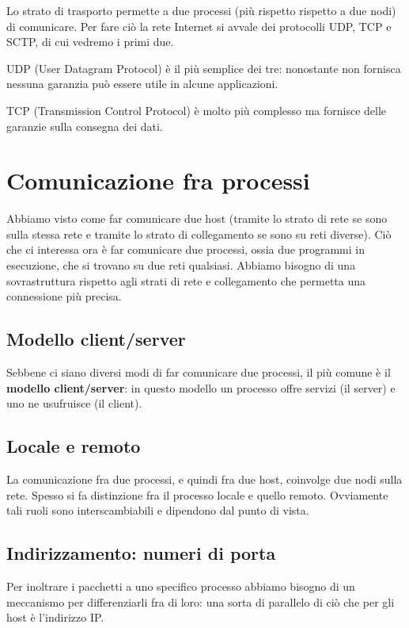 Lo strato di trasporto permette a due processi (più rispetto rispetto a due nodi) di comunicare. Per fare ciò la rete Internet si avvale dei protocolli UDP, TCP e SCTP, di cui vedremo i primi due.

UDP (User Datagram Protocol) è il più semplice dei tre: nonostante non fornisca nessuna garanzia può essere utile in alcune applicazioni.

TCP (Transmission Control Protocol) è molto più complesso ma fornisce delle garanzie sulla consegna dei dati.

\section{Comunicazione fra processi}
    Abbiamo visto come far comunicare due host (tramite lo strato di rete se sono sulla stessa rete e tramite lo strato di collegamento se sono su reti diverse). Ciò che ci interessa ora è far comunicare due processi, ossia due programmi in esecuzione, che si trovano su due reti qualsiasi. Abbiamo bisogno di una sovrastruttura rispetto agli strati di rete e collegamento che permetta una connessione più precisa.
    
    \subsection{Modello client/server}
        Sebbene ci siano diversi modi di far comunicare due processi, il più comune è il \textbf{modello client/server}: in questo modello un processo offre servizi (il server) e uno ne usufruisce (il client).
        
    \subsection{Locale e remoto}
        La comunicazione fra due processi, e quindi fra due host, coinvolge due nodi sulla rete. Spesso si fa distinzione fra il processo locale e quello remoto. Ovviamente tali ruoli sono interscambiabili e dipendono dal punto di vista.
        
    \subsection{Indirizzamento: numeri di porta}
        Per inoltrare i pacchetti a uno specifico processo abbiamo bisogno di un meccanismo per differenziarli fra di loro: una sorta di parallelo di ciò che per gli host è l'indirizzo IP.
        
